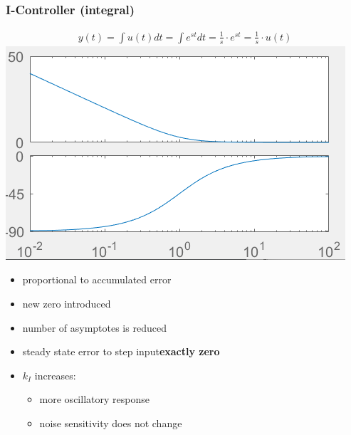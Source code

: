     \subsubsection{I-Controller (integral)}
            \begin{align*}
                y(t) = \int u(t) dt = \int e^{st} dt = \frac{1}{s} \cdot e^{st} = \frac{1}{s} \cdot u(t)
            \end{align*}
            \includegraphics[width = \linewidth]{src/images/PI-controller.png}
        \begin{itemize}
            \item proportional to accumulated error
            \item new zero introduced
            \item number of asymptotes is reduced
            \item steady state error to step input\textbf{exactly zero}
            \item $k_I$ increases:
            \begin{itemize}
                \item more oscillatory response
                \item noise sensitivity does not change
            \end{itemize}
        \end{itemize}

